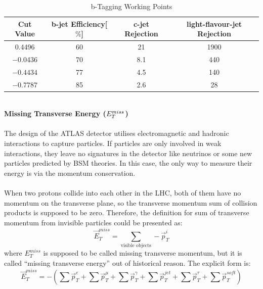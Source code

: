 \begin{table}[h]
	\caption{b-Tagging Working Points}
	\renewcommand{\arraystretch}{1.5}
	\centering
	\begin{adjustbox}{center}
		\begin{tabular}{|c | c | c | c |}
			\hline
			\hline
			{\bf Cut Value}    & {\bf b-jet Efficiency[$\%$]}  & {\bf c-jet Rejection} & {\bf light-flavour-jet Rejection}\\
			\hline
			0.4496 & 60 & 21 & 1900 \\
			\hline
			$-$0.0436& 70 & 8.1& 440 \\
			\hline
			$-0.4434$& 77 & 4.5& 140 \\
			\hline
			$-0.7787$& 85 & 2.6&  28 \\
			\hline
		\end{tabular}
	\end{adjustbox}
	\label{Tab:b-tag}
\end{table}		
\noindent
\\{\bf Missing Transverse Energy ($E_{T}^{miss}$)}
\\
\\The design of the ATLAS detector utilises electromagnetic and hadronic interactions to capture particles. If particles are only involved in weak interactions, they leave no signatures in the detector like neutrinos or some new particles predicted by BSM theories. In this case, the only way to measure their energy is via the momentum conservation. 
\\
\\When two protons collide into each other in the LHC, both of them have no momentum on the transverse plane, so the transverse momentum sum of collision products is supposed to be zero. Therefore, the definition for sum of transverse momentum from invisible particles could be presented as:
\begin{equation}
\vec{E}_{T}^{miss} = \sum_{\text{visible objects}} -\vec{p}_{T}^{i}
\end{equation}
where $E_{T}^{miss}$ is supposed to be called missing transverse momentum, but it is called ``missing transverse energy'' out of historical reason. The explicit form is:
\begin{equation}
\vec{E}_{T}^{miss} = -(\sum \vec{p}_{T}^{e} +\sum \vec{p}_{T}^{\mu} +\sum \vec{p}_{T}^{\gamma} +\sum \vec{p}_{T}^{jet} +\sum \vec{p}_{T}^{\tau}+\sum \vec{p}_{T}^{soft})
\end{equation}
